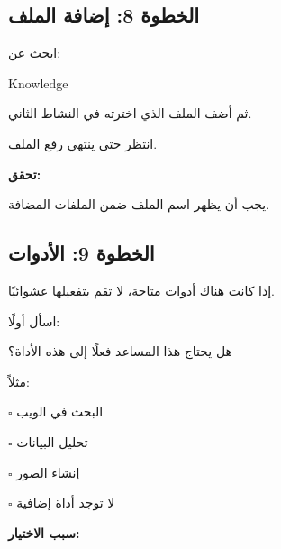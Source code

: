 \documentclass[a4paper]{article}
\begin{document}

\subsection*{\khatt الخطوة 8: إضافة الملف}

ابحث عن:

\begin{center}

\textenglish{Knowledge}

\end{center}

ثم أضف الملف الذي اخترته في النشاط الثاني.

انتظر حتى ينتهي رفع الملف.

\textbf{تحقق:}

يجب أن يظهر اسم الملف ضمن الملفات المضافة.



\subsection*{\khatt الخطوة 9: الأدوات}

إذا كانت هناك أدوات متاحة، لا تقم بتفعيلها
عشوائيًا.

اسأل أولًا:

\begin{center}

هل يحتاج هذا المساعد فعلًا إلى هذه الأداة؟

\end{center}

مثلاً:

\begin{center}

$\square$ البحث في الويب

\hspace{0.8cm}

$\square$ تحليل البيانات

\hspace{0.8cm}

$\square$ إنشاء الصور

\end{center}

\begin{center}

$\square$ لا توجد أداة إضافية

\end{center}

\textbf{سبب الاختيار:}
\end{document}
